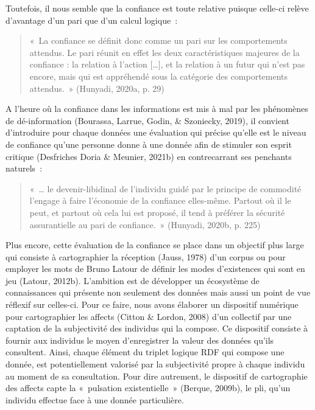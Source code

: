 \documentclass[
  a4paper,
  DIV=11,
  numbers=noendperiod]{scrreprt}
\begin{document}
Toutefois, il nous semble que la confiance est toute relative puisque
celle-ci relève d'avantage d'un pari que d'un calcul logique~:

\begin{quote}
«~La confiance se définit donc comme un pari sur les comportements
attendus. Le pari réunit en effet les deux caractéristiques majeures de
la confiance : la relation à l'action {[}\ldots{]}, et la relation à un
futur qui n'est pas encore, mais qui est appréhendé sous la catégorie
des comportements attendus.~» (Hunyadi, 2020a, p. 29)
\end{quote}

A l'heure où la confiance dans les informations est mis à mal par les
phénomènes de dé-information (Bourassa, Larrue, Godin, \& Szoniecky,
2019), il convient d'introduire pour chaque données une évaluation qui
précise qu'elle est le niveau de confiance qu'une personne donne à une
donnée afin de stimuler son esprit critique (Desfriches Doria \&
Meunier, 2021b) en contrecarrant ses penchants naturels~:

\begin{quote}
«~\ldots{} le devenir-libidinal de l'individu guidé par le principe de
commodité l'engage à faire l'économie de la confiance elles-même.
Partout où il le peut, et partout où cela lui est proposé, il tend à
préférer la sécurité assurantielle au pari de confiance.~» (Hunyadi,
2020b, p. 225)
\end{quote}

Plus encore, cette évaluation de la confiance se place dans un objectif
plus large qui consiste à cartographier la réception (Jauss, 1978) d'un
corpus ou pour employer les mots de Bruno Latour de définir les modes
d'existences qui sont en jeu (Latour, 2012b). L'ambition est de
développer un écosystème de connaissances qui présente non seulement des
données mais aussi un point de vue réflexif sur celles-ci. Pour ce
faire, nous avons élaborer un dispositif numérique pour cartographier
les affects (Citton \& Lordon, 2008) d'un collectif par une captation de
la subjectivité des individus qui la compose. Ce dispositif consiste à
fournir aux individus le moyen d'enregistrer la valeur des données
qu'ils consultent. Ainsi, chaque élément du triplet logique RDF qui
compose une donnée, est potentiellement valorisé par la subjectivité
propre à chaque individu au moment de sa consultation. Pour dire
autrement, le dispositif de cartographie des affects capte la
«~pulsation existentielle~» (Berque, 2009b), le pli, qu'un individu
effectue face à une donnée particulière.
\end{document}
